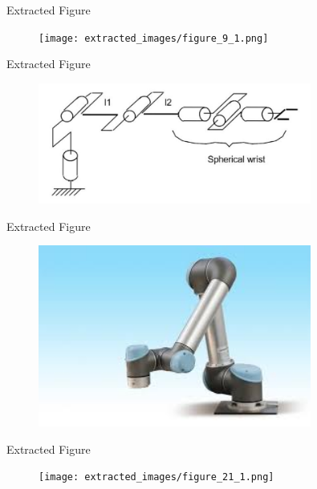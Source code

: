 \documentclass{beamer}
\begin{document}
\begin{frame}{Extracted Figure}
    \centering
    \begin{figure}
        \texttt{[image: extracted\_images/figure\_9\_1.png]}  %
    \end{figure}
\end{frame}

\begin{frame}{Extracted Figure}
    \centering
    \begin{figure}
        \includegraphics[width=0.8\textwidth]{extracted_images/figure_19_1.png}  %
    \end{figure}
\end{frame}

\begin{frame}{Extracted Figure}
    \centering
    \begin{figure}
        \includegraphics[width=0.8\textwidth]{extracted_images/figure_20_1.png}  %
    \end{figure}
\end{frame}

\begin{frame}{Extracted Figure}
    \centering
    \begin{figure}
        \texttt{[image: extracted\_images/figure\_21\_1.png]}  %
    \end{figure}
\end{frame}
\end{document}

